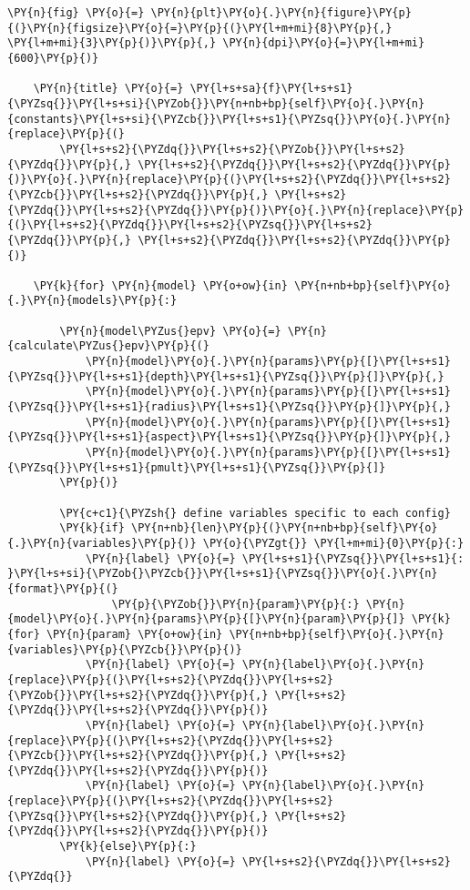 \begin{tcolorbox}[breakable, size=fbox, boxrule=1pt, pad at break*=1mm,colback=cellbackground, colframe=cellborder]
\begin{Verbatim}[commandchars=\\\{\}]
    \PY{n}{fig} \PY{o}{=} \PY{n}{plt}\PY{o}{.}\PY{n}{figure}\PY{p}{(}\PY{n}{figsize}\PY{o}{=}\PY{p}{(}\PY{l+m+mi}{8}\PY{p}{,} \PY{l+m+mi}{3}\PY{p}{)}\PY{p}{,} \PY{n}{dpi}\PY{o}{=}\PY{l+m+mi}{600}\PY{p}{)}

    \PY{n}{title} \PY{o}{=} \PY{l+s+sa}{f}\PY{l+s+s1}{\PYZsq{}}\PY{l+s+si}{\PYZob{}}\PY{n+nb+bp}{self}\PY{o}{.}\PY{n}{constants}\PY{l+s+si}{\PYZcb{}}\PY{l+s+s1}{\PYZsq{}}\PY{o}{.}\PY{n}{replace}\PY{p}{(}
        \PY{l+s+s2}{\PYZdq{}}\PY{l+s+s2}{\PYZob{}}\PY{l+s+s2}{\PYZdq{}}\PY{p}{,} \PY{l+s+s2}{\PYZdq{}}\PY{l+s+s2}{\PYZdq{}}\PY{p}{)}\PY{o}{.}\PY{n}{replace}\PY{p}{(}\PY{l+s+s2}{\PYZdq{}}\PY{l+s+s2}{\PYZcb{}}\PY{l+s+s2}{\PYZdq{}}\PY{p}{,} \PY{l+s+s2}{\PYZdq{}}\PY{l+s+s2}{\PYZdq{}}\PY{p}{)}\PY{o}{.}\PY{n}{replace}\PY{p}{(}\PY{l+s+s2}{\PYZdq{}}\PY{l+s+s2}{\PYZsq{}}\PY{l+s+s2}{\PYZdq{}}\PY{p}{,} \PY{l+s+s2}{\PYZdq{}}\PY{l+s+s2}{\PYZdq{}}\PY{p}{)}
    
    \PY{k}{for} \PY{n}{model} \PY{o+ow}{in} \PY{n+nb+bp}{self}\PY{o}{.}\PY{n}{models}\PY{p}{:}

        \PY{n}{model\PYZus{}epv} \PY{o}{=} \PY{n}{calculate\PYZus{}epv}\PY{p}{(}
            \PY{n}{model}\PY{o}{.}\PY{n}{params}\PY{p}{[}\PY{l+s+s1}{\PYZsq{}}\PY{l+s+s1}{depth}\PY{l+s+s1}{\PYZsq{}}\PY{p}{]}\PY{p}{,}
            \PY{n}{model}\PY{o}{.}\PY{n}{params}\PY{p}{[}\PY{l+s+s1}{\PYZsq{}}\PY{l+s+s1}{radius}\PY{l+s+s1}{\PYZsq{}}\PY{p}{]}\PY{p}{,}
            \PY{n}{model}\PY{o}{.}\PY{n}{params}\PY{p}{[}\PY{l+s+s1}{\PYZsq{}}\PY{l+s+s1}{aspect}\PY{l+s+s1}{\PYZsq{}}\PY{p}{]}\PY{p}{,}
            \PY{n}{model}\PY{o}{.}\PY{n}{params}\PY{p}{[}\PY{l+s+s1}{\PYZsq{}}\PY{l+s+s1}{pmult}\PY{l+s+s1}{\PYZsq{}}\PY{p}{]}
        \PY{p}{)}

        \PY{c+c1}{\PYZsh{} define variables specific to each config}
        \PY{k}{if} \PY{n+nb}{len}\PY{p}{(}\PY{n+nb+bp}{self}\PY{o}{.}\PY{n}{variables}\PY{p}{)} \PY{o}{\PYZgt{}} \PY{l+m+mi}{0}\PY{p}{:}
            \PY{n}{label} \PY{o}{=} \PY{l+s+s1}{\PYZsq{}}\PY{l+s+s1}{: }\PY{l+s+si}{\PYZob{}\PYZcb{}}\PY{l+s+s1}{\PYZsq{}}\PY{o}{.}\PY{n}{format}\PY{p}{(}
                \PY{p}{\PYZob{}}\PY{n}{param}\PY{p}{:} \PY{n}{model}\PY{o}{.}\PY{n}{params}\PY{p}{[}\PY{n}{param}\PY{p}{]} \PY{k}{for} \PY{n}{param} \PY{o+ow}{in} \PY{n+nb+bp}{self}\PY{o}{.}\PY{n}{variables}\PY{p}{\PYZcb{}}\PY{p}{)}
            \PY{n}{label} \PY{o}{=} \PY{n}{label}\PY{o}{.}\PY{n}{replace}\PY{p}{(}\PY{l+s+s2}{\PYZdq{}}\PY{l+s+s2}{\PYZob{}}\PY{l+s+s2}{\PYZdq{}}\PY{p}{,} \PY{l+s+s2}{\PYZdq{}}\PY{l+s+s2}{\PYZdq{}}\PY{p}{)}
            \PY{n}{label} \PY{o}{=} \PY{n}{label}\PY{o}{.}\PY{n}{replace}\PY{p}{(}\PY{l+s+s2}{\PYZdq{}}\PY{l+s+s2}{\PYZcb{}}\PY{l+s+s2}{\PYZdq{}}\PY{p}{,} \PY{l+s+s2}{\PYZdq{}}\PY{l+s+s2}{\PYZdq{}}\PY{p}{)}
            \PY{n}{label} \PY{o}{=} \PY{n}{label}\PY{o}{.}\PY{n}{replace}\PY{p}{(}\PY{l+s+s2}{\PYZdq{}}\PY{l+s+s2}{\PYZsq{}}\PY{l+s+s2}{\PYZdq{}}\PY{p}{,} \PY{l+s+s2}{\PYZdq{}}\PY{l+s+s2}{\PYZdq{}}\PY{p}{)}
        \PY{k}{else}\PY{p}{:}
            \PY{n}{label} \PY{o}{=} \PY{l+s+s2}{\PYZdq{}}\PY{l+s+s2}{\PYZdq{}}


\end{Verbatim}
\end{tcolorbox}
